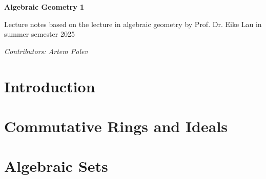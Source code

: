 \documentclass{article}
\begin{document}
\begin{center}
  {\LARGE
  \textbf{Algebraic Geometry 1}}

  \vspace{2cm}
  
  \large
  Lecture notes based on the lecture in algebraic geometry by Prof. Dr. Eike Lau
  in summer semester 2025

  \vspace{0.5cm}
  
  \vfill
  
  \hrulefill

  \vspace{0.5cm}

  \normalsize
  \textit{Contributors: Artem Polev}
  
\end{center}

\newpage

\section{Introduction}



\section{Commutative Rings and Ideals}



\section{Algebraic Sets}


\end{document}
